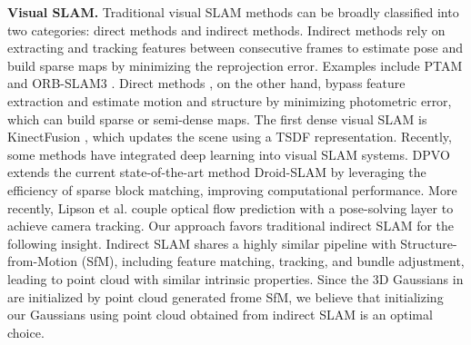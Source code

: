 \noindent\textbf{Visual SLAM.} Traditional visual SLAM methods can be broadly classified into two categories: direct methods and indirect methods. Indirect methods rely on extracting and tracking features between consecutive frames to estimate pose and build sparse maps by minimizing the reprojection error. Examples include PTAM \cite{PTAM}  and ORB-SLAM3 \cite{ORB-SLAM32021}. Direct methods \cite{LSD-SLAM, DSO, DSM}, on the other hand, bypass feature extraction and estimate motion and structure by minimizing photometric error, which can build sparse or semi-dense maps. The first dense visual SLAM is KinectFusion \cite{KinectFusion}, which updates the scene using a TSDF representation. Recently, some methods \cite{CodeSLAM, SceneCode, NodeSLAM, DROID-SLAM2021, MS_SLAM_2024CVPR} have integrated deep learning into visual SLAM systems. DPVO \cite{DPVO} extends the current state-of-the-art method Droid-SLAM \cite{DROID-SLAM2021} by leveraging the efficiency of sparse block matching, improving computational performance. More recently, Lipson et al. \cite{MS_SLAM_2024CVPR} couple optical flow prediction with a pose-solving layer to achieve camera tracking.  Our approach favors traditional indirect SLAM for the following insight. Indirect SLAM shares a highly similar pipeline with Structure-from-Motion (SfM), including feature matching, tracking, and bundle adjustment, leading to point cloud with similar intrinsic properties. Since the 3D Gaussians in \cite{3DGS2023}  are initialized by point cloud generated frome SfM, we believe that initializing our Gaussians using point cloud obtained from indirect SLAM is an optimal choice.


